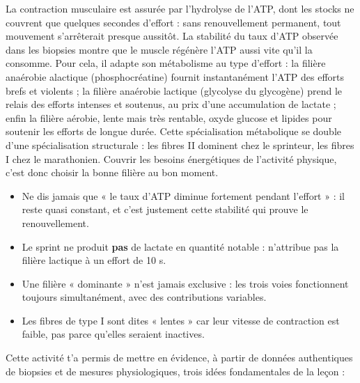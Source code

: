 \documentclass[11pt]{article}
\newcounter{popsec}
\newcounter{popsub}
\newcommand{\courssub}[1]{%
  \stepcounter{popsub}%
  \par\vspace{9pt}\noindent{\popxbold\fontsize{11.5}{13}\selectfont\color{popink}{\color{poporange}\thepopsec.\thepopsub}\hspace{6pt}#1}\par\nopagebreak\vspace{4pt}
}
\begin{document}
\begin{exoresolu}
La contraction musculaire est assurée par l'hydrolyse de l'ATP, dont les stocks ne couvrent que quelques secondes d'effort : sans renouvellement permanent, tout mouvement s'arrêterait presque aussitôt. La stabilité du taux d'ATP observée dans les biopsies montre que le muscle régénère l'ATP aussi vite qu'il la consomme. Pour cela, il adapte son métabolisme au type d'effort : la filière anaérobie alactique (phosphocréatine) fournit instantanément l'ATP des efforts brefs et violents ; la filière anaérobie lactique (glycolyse du glycogène) prend le relais des efforts intenses et soutenus, au prix d'une accumulation de lactate ; enfin la filière aérobie, lente mais très rentable, oxyde glucose et lipides pour soutenir les efforts de longue durée. Cette spécialisation métabolique se double d'une spécialisation structurale : les fibres II dominent chez le sprinteur, les fibres I chez le marathonien. Couvrir les besoins énergétiques de l'activité physique, c'est donc choisir la bonne filière au bon moment.
\end{exoresolu}

\begin{attention}
\begin{itemize}
\item Ne dis jamais que « le taux d'ATP diminue fortement pendant l'effort » : il reste quasi constant, et c'est justement cette stabilité qui prouve le renouvellement.
\item Le sprint ne produit \textbf{pas} de lactate en quantité notable : n'attribue pas la filière lactique à un effort de 10 s.
\item Une filière « dominante » n'est jamais exclusive : les trois voies fonctionnent toujours simultanément, avec des contributions variables.
\item Les fibres de type I sont dites « lentes » car leur vitesse de contraction est faible, pas parce qu'elles seraient inactives.
\end{itemize}
\end{attention}

\courssub{Bilan de l'activité}

Cette activité t'a permis de mettre en évidence, à partir de données authentiques de biopsies et de mesures physiologiques, trois idées fondamentales de la leçon :
\end{document}
